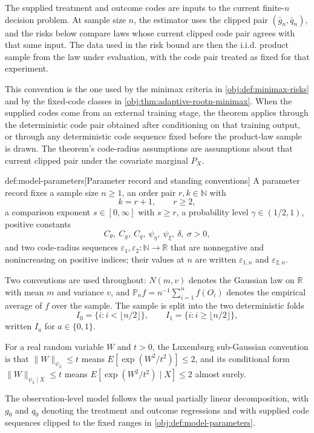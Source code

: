 \documentclass[11pt]{article}
\begin{document}
The supplied treatment and outcome codes are inputs to the current finite-\(n\) decision problem. At sample size \(n\), the estimator uses the clipped pair \((\bar g_n,\bar q_n)\), and the risks below compare laws whose current clipped code pair agrees with that same input. The data used in the risk bound are then the i.i.d. product sample from the law under evaluation, with the code pair treated as fixed for that experiment.

This convention is the one used by the minimax criteria in \cref{obj:def:minimax-risks} and by the fixed-code classes in \cref{obj:thm:adaptive-rootn-minimax}. When the supplied codes come from an external training stage, the theorem applies through the deterministic code pair obtained after conditioning on that training output, or through any deterministic code sequence fixed before the product-law sample is drawn. The theorem's code-radius assumptions are assumptions about that current clipped pair under the covariate marginal \(P_X\).

\begin{definitionv}{def:model-parameters}[Parameter record and standing conventions]
A parameter record fixes a sample size \(n\ge 1\), an order pair \(r,k\in\mathbb N\) with
\[
 k=r+1,\qquad r\ge 2,
\]
a comparison exponent \(s\in[0,\infty]\) with \(s\ge r\), a probability level \(\gamma\in(1/2,1)\), positive constants
\[
 C_{\theta},\ C_g,\ C_q,\ \psi_{\eta},\ \psi_{\xi},\ \delta,\ \sigma>0,
\]
and two code-radius sequences \(\varepsilon_1,\varepsilon_2:\mathbb N\to\mathbb R\) that are nonnegative and nonincreasing on positive indices; their values at \(n\) are written \(\varepsilon_{1,n}\) and \(\varepsilon_{2,n}\).

Two conventions are used throughout: \(N(m,v)\) denotes the Gaussian law on \(\mathbb R\) with mean \(m\) and variance \(v\), and \(\mathbb P_n f=n^{-1}\sum_{i=1}^{n}f(O_i)\) denotes the empirical average of \(f\) over the sample.  The sample is split into the two deterministic folds
\[
 I_0=\{i:i<\lfloor n/2\rfloor\},\qquad I_1=\{i:i\ge\lfloor n/2\rfloor\},
\]
written \(I_a\) for \(a\in\{0,1\}\).

For a real random variable \(W\) and \(t>0\), the Luxemburg sub-Gaussian convention is that \(\lVert W\rVert_{\psi_2}\le t\) means \(E[\exp(W^2/t^2)]\le 2\), and its conditional form \(\lVert W\rVert_{\psi_2\mid X}\le t\) means \(E[\exp(W^2/t^2)\mid X]\le 2\) almost surely.
\end{definitionv}

The observation-level model follows the usual partially linear decomposition, with \(g_0\) and \(q_0\) denoting the treatment and outcome regressions and with supplied code sequences clipped to the fixed ranges in \cref{obj:def:model-parameters}.
\end{document}
